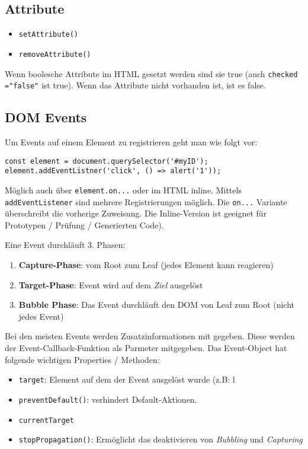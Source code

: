 \documentclass[11pt,twoside,landscape]{article}
\begin{document}
\begin{multicols}{4}
\subsection{Attribute}
\label{sec:orga9de88f}
\begin{itemize}
\item \texttt{setAttribute()}
\item \texttt{removeAttribute()}
\end{itemize}

Wenn boolesche Attribute im HTML gesetzt werden sind sie true (auch \texttt{checked ="false"} ist true). Wenn das Attribute nicht vorhanden ist, ist es false.

\subsection{DOM Events}
\label{sec:orgb45c623}
Um Events auf einem Element zu registrieren geht man wie folgt vor:
\lstset{language=js,label= ,caption= ,captionpos=b,numbers=none}
\begin{lstlisting}
const element = document.querySelector('#myID');
element.addEventListner('click', () => alert('1'));
\end{lstlisting}
Möglich auch über \texttt{element.on...} oder im HTML inline. Mittels \texttt{addEventListener} sind mehrere Registrierungen möglich. Die \texttt{on...} Variante überschreibt die vorherige Zuweisung. Die Inline-Version ist geeignet für Prototypen / Prüfung / Generierten Code).

Eine Event durchläuft 3. Phasen: 
\begin{enumerate}
\item \textbf{Capture-Phase}: vom Root zum Leaf (jedes Element kann reagieren)
\item \textbf{Target-Phase}: Event wird auf dem \emph{Ziel} ausgelöst
\item \textbf{Bubble Phase}: Das Event durchläuft den DOM von Leaf zum Root (nicht jedes Event)
\end{enumerate}

Bei den meisten Events werden Zusatzinformationen mit gegeben. Diese werden der Event-Callback-Funktion als Parmeter mitgegeben. Das Event-Object hat folgende wichtigen Properties / Methoden: 
\begin{itemize}
\item \texttt{target}: Element auf dem der Event ausgelöst wurde (z.B: l
\item \texttt{preventDefault()}: verhindert Default-Aktionen.
\item \texttt{currentTarget}
\item \texttt{stopPropagation()}: Ermöglicht das deaktivieren von \emph{Bubbling} und \emph{Capturing}
\end{itemize}


\end{multicols}
\end{document}
